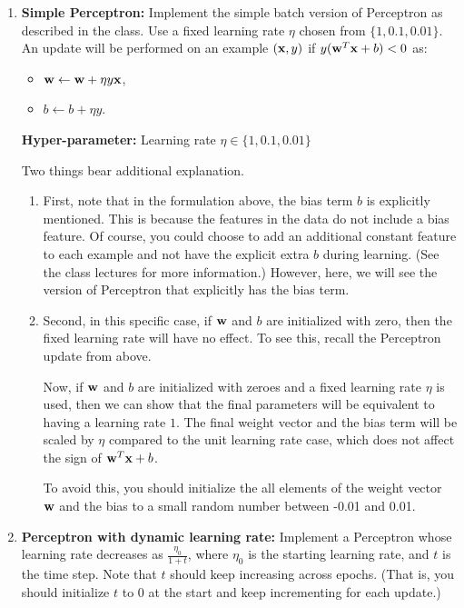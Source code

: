 \begin{enumerate}
\item \textbf{Simple Perceptron:} Implement the simple batch version
  of Perceptron as described in the class. Use a fixed learning rate
  $\eta$ chosen from $\{1,0.1,0.01\}$. An update will be performed on
  an example $({\bf x}, y)$ if $y({\bf w}^T{\bf x} + b) < 0$ as:
  \begin{itemize}
  \item[] ${\bf w} \leftarrow {\bf w} + \eta y {\bf x}$,
  \item[] $b \leftarrow b + \eta y$.
  \end{itemize}

  \textbf{Hyper-parameter:} Learning rate $\eta\in\{1,0.1,0.01\}$


  Two things bear additional explanation. 

  \begin{enumerate}
  \item First, note that in the formulation above, the bias term $b$
    is explicitly mentioned. This is because the features in the data
    do not include a bias feature. Of course, you could choose to add
    an additional constant feature to each example and not have the
    explicit extra $b$ during learning. (See the class lectures for
    more information.) However, here, we will see the version of
    Perceptron that explicitly has the bias term.
  \item Second, in this specific case, if ${\bf w}$ and $b$ are
    initialized with zero, then the fixed learning rate will have no
    effect. To see this, recall the Perceptron update from above.
    
    Now, if ${\bf w}$ and $b$ are initialized with zeroes and a fixed
    learning rate $\eta$ is used, then we can show that the final
    parameters will be equivalent to having a learning rate $1$. The
    final weight vector and the bias term will be scaled by $\eta$
    compared to the unit learning rate case, which does not affect the
    sign of ${\bf w}^T{\bf x} + b$.
    
    To avoid this, you should initialize the all elements of the
    weight vector ${\bf w}$ and the bias to a small random number between
    -0.01 and 0.01.
    
  \end{enumerate}

\item \textbf{Perceptron with dynamic learning rate:} Implement a
  Perceptron whose learning rate decreases as $\frac{\eta_0}{1+t}$,
  where $\eta_0$ is the starting learning rate, and $t$ is the time
  step. Note that $t$ should keep increasing across epochs. (That is,
  you should initialize $t$ to $0$ at the start and keep incrementing
  for each update.)


\end{enumerate}
